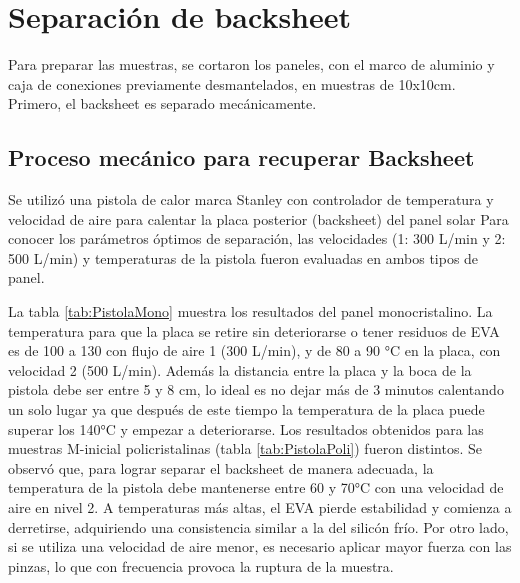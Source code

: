 
\section{Separación de backsheet}
\label{sec:Resultados backsheet}
Para preparar las muestras, se cortaron los paneles, con el marco de aluminio y caja de conexiones previamente desmantelados, en muestras de 10x10cm. Primero, el backsheet es separado mecánicamente. 

\subsection{Proceso mecánico para recuperar Backsheet } 
\label{resultados mecanicos backsheet}

Se utilizó una pistola de calor marca Stanley con controlador de temperatura y velocidad de aire para calentar la placa posterior (backsheet) del panel solar Para conocer los parámetros óptimos de separación, las velocidades (1: 300 L/min y 2: 500 L/min) y temperaturas de la pistola fueron evaluadas en ambos tipos de panel. 

La tabla \ref{tab:PistolaMono} muestra los resultados del panel monocristalino. La temperatura para que la placa se retire sin deteriorarse o tener residuos de EVA es de 100 a 130 con flujo de aire 1 (300 L/min), y de 80 a 90 °C en la placa, con velocidad 2 (500 L/min). Además la distancia entre la placa y la boca de la pistola debe ser entre 5 y 8 cm, lo ideal es no dejar más de 3 minutos calentando un solo lugar ya que después de este tiempo la temperatura de la placa puede superar los 140°C y empezar a deteriorarse. 
Los resultados obtenidos para las muestras M-inicial policristalinas (tabla \ref{tab:PistolaPoli}) fueron distintos. Se observó que, para lograr separar el backsheet de manera adecuada, la temperatura de la pistola debe mantenerse entre 60 y 70°C con una velocidad de aire en nivel 2. A temperaturas más altas, el EVA pierde estabilidad y comienza a derretirse, adquiriendo una consistencia similar a la del silicón frío. Por otro lado, si se utiliza una velocidad de aire menor, es necesario aplicar mayor fuerza con las pinzas, lo que con frecuencia provoca la ruptura de la muestra.

